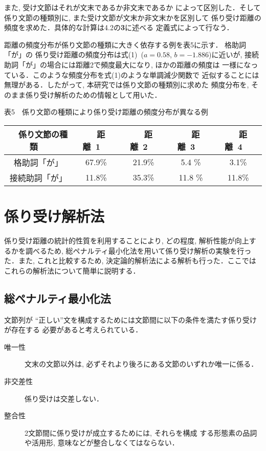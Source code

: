 また, 受け文節はそれが文末であるか非文末であるか
によって区別した．そして係り文節の種類別に, また受け文節が文末か非文末かを区別して
係り受け距離の頻度を求めた．具体的な計算は4.2の{\bf 3}に述べる
定義式によって行なう．

距離の頻度分布が係り文節の種類に大きく依存する例を表5に示す．
格助詞「が」の 係り受け距離の頻度分布は式(1)\ ($a=0.58$, $b=-1.886$)に近いが,
 接続助詞「が」の場合には距離2で頻度最大になり, ほかの距離の頻度は
一様になっている．このような頻度分布を式(1)のような単調減少関数で
近似することには無理がある．したがって, 本研究では係り文節の種類別に求めた
頻度分布を, そのまま係り受け解析のための情報として用いた．

\begin{center}
表5\ \  係り文節の種類により係り受け距離の頻度分布が異なる例
\vspace*{2mm}
\\
\begin{tabular}{|c|c|c|c|c|}
\hline
\ \ 係り文節の種類\ \  &\ \  距離\ 1\ \ &\ \ 距離\ 2\ \ &\ \  距離\ 3\ \ &\ \  距離\ 4\ \ \\ \hline
\hline
 格助詞「が」       & 67.9\% & 21.9\% & 5.4 \%  & 3.1\%  \\ \hline
 接続助詞「が」     & 11.8\% & 35.3\% &11.8 \%  & 11.8\% \\ \hline
\end{tabular}
\end{center}
\section{係り受け解析法}
係り受け距離の統計的性質を利用することにより, どの程度, 解析性能が向上するかを調べるため,
総ペナルティ最小化法\cite{matsu,ozeki}を用いて係り受け解析の実験を行った．また,
 これと比較するため, 決定論的解析法による解析も行った．ここでは
これらの解析法について簡単に説明する．
\subsection{総ペナルティ最小化法}
文節列が “正しい”文を構成するためには文節間に以下の条件を満たす係り受けが存在する
必要があると考えられている\cite{yoshida}．

\begin{description}
\item[唯一性] 文末の文節以外は, 必ずそれより後ろにある文節のいずれか唯一に係る．
\item[非交差性] 係り受けは交差しない．
\item[整合性] 2文節間に係り受けが成立するためには, それらを構成
              する形態素の品詞や活用形, 意味などが整合しなくてはならない．
\end{description}

